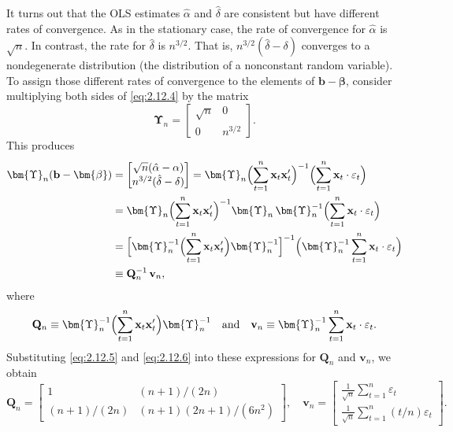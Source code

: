 It turns out that the OLS estimates $\hat{\alpha}$ and $\hat{\delta}$ are consistent but have different rates
of convergence. As in the stationary case, the rate of convergence for $\hat{\alpha}$ is $\sqrt{n}$. In
contrast, the rate for $\hat{\delta}$ is $n^{3/2}$. That is, $n^{3/2}(\hat{\delta} - \delta)$ converges to a nondegenerate
distribution (the distribution of a nonconstant random variable). To assign those
different rates of convergence to the elements of $\mathbf{b} - \bm{\beta}$, consider multiplying both
sides of \eqref{eq:2.12.4} by the matrix
%
\begin{equation}
\bm{\Upsilon}_n = \begin{bmatrix}
\sqrt{n} & 0 \\ 0 & n^{3/2}
\end{bmatrix}.
\label{eq:2.12.6}
\end{equation}
%
This produces
%
\begin{align}
\bm{\Upsilon}_n(\mathbf{b} - \bm{\beta})
&= \begin{bmatrix}
\sqrt{n}(\hat{\alpha} - \alpha) \\ n^{3/2}(\hat{\delta} - \delta)
\end{bmatrix}
= \bm{\Upsilon}_n
\Bigl(\sum_{t=1}^{n}\mathbf{x}_t\mathbf{x}_t'\Bigr)^{-1}
\Bigl(\sum_{t=1}^{n}\mathbf{x}_t \cdot \varepsilon_t\Bigr) \notag \\
&= \bm{\Upsilon}_n
\Bigl(\sum_{t=1}^{n}\mathbf{x}_t\mathbf{x}_t'\Bigr)^{-1}
\bm{\Upsilon}_n\,\bm{\Upsilon}_n^{-1}
\Bigl(\sum_{t=1}^{n}\mathbf{x}_t \cdot \varepsilon_t\Bigr) \notag \\
&= \Bigl[\bm{\Upsilon}_n^{-1}
\Bigl(\sum_{t=1}^{n}\mathbf{x}_t\mathbf{x}_t'\Bigr)
\bm{\Upsilon}_n^{-1}\Bigr]^{-1}
\Bigl(\bm{\Upsilon}_n^{-1}\sum_{t=1}^{n}\mathbf{x}_t \cdot \varepsilon_t\Bigr)
\notag \\
&\equiv \mathbf{Q}_n^{-1}\,\mathbf{v}_n,
\label{eq:2.12.7}
\end{align}
%
where
%
\begin{equation}
\mathbf{Q}_n \equiv \bm{\Upsilon}_n^{-1}
\Bigl(\sum_{t=1}^{n}\mathbf{x}_t\mathbf{x}_t'\Bigr)\bm{\Upsilon}_n^{-1}
\quad \text{and} \quad
\mathbf{v}_n \equiv \bm{\Upsilon}_n^{-1}
\sum_{t=1}^{n}\mathbf{x}_t \cdot \varepsilon_t.
\label{eq:2.12.8}
\end{equation}
%
Substituting \eqref{eq:2.12.5} and \eqref{eq:2.12.6} into these expressions for $\mathbf{Q}_n$ and $\mathbf{v}_n$, we obtain
%
\begin{equation}
\mathbf{Q}_n = \begin{bmatrix}
1 & (n+1)/(2n) \\
(n+1)/(2n) & (n+1)(2n+1)/(6n^2)
\end{bmatrix}, \quad
\mathbf{v}_n = \begin{bmatrix}
\frac{1}{\sqrt{n}}\sum_{t=1}^{n}\varepsilon_t \\[4pt]
\frac{1}{\sqrt{n}}\sum_{t=1}^{n}(t/n)\varepsilon_t
\end{bmatrix}.
\label{eq:2.12.9}
\end{equation}
